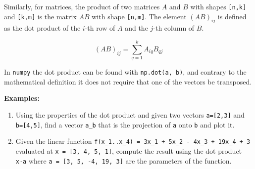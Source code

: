 \documentclass[11pt]{article}
\begin{document}
Similarly, for matrices, the product of two matrices \(A\) and \(B\)
with shapes \texttt{{[}n,k{]}} and \texttt{{[}k,m{]}} is the matrix
\(AB\) with shape \texttt{{[}n,m{]}}. The element \((AB)_{ij}\) is
defined as the dot product of the \(i\)-th row of \(A\) and the \(j\)-th
column of \(B\).

\[
(AB)_{ij} = \sum_{q=1}^{k} A_{iq} B_{qj}
\]

In \texttt{numpy} the dot product can be found with
\texttt{np.dot(a,\ b)}, and contrary to the mathematical definition it
does not require that one of the vectors be transposed.

\textbf{Examples:}

\begin{enumerate}
\def\labelenumi{\arabic{enumi}.}
\item
  Using the properties of the dot product and given two vectors
  \texttt{a={[}2,3{]}} and \texttt{b={[}4,5{]}}, find a vector
  \texttt{a\_b} that is the projection of \texttt{a} onto \texttt{b} and
  plot it.
\item
  Given the linear function
  \texttt{f(x\_1..x\_4)\ =\ 3x\_1\ +\ 5x\_2\ -\ 4x\_3\ +\ 19x\_4\ +\ 3}
  evaluated at \texttt{x\ =\ {[}3,\ 4,\ 5,\ 1{]}}, compute the result
  using the dot product \texttt{x·a} where
  \texttt{a\ =\ {[}3,\ 5,\ -4,\ 19,\ 3{]}} are the parameters of the
  function.
\end{enumerate}
\end{document}
